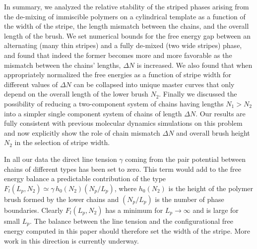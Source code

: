 In summary, we analyzed the relative stability of the striped phases  arising from the de-mixing of immiscible polymers 
on a cylindrical template as a function of the width of the stripe, the length mismatch between the chains, and the overall length of the brush. We set numerical bounds for the free energy gap between an alternating (many thin stripes) and a fully de-mixed (two wide stripes) phase, and found that indeed the former
becomes more and more favorable as the mismatch between the chains' lengths, $\Delta N$ is increased.
We also found that when appropriately normalized the free energies as a function of stripe width for different values of $\Delta N$  can be collapsed into unique master curves that only depend on the overall length of the lower brush $N_2$. Finally we discussed the possibility of reducing a two-component system of chains 
having lengths $N_1>N_2$ into a simpler single component system of chains of length $\Delta N$.
Our results are fully consistent with previous molecular dynamics simulations on this problem and now 
explicitly show the role of chain mismatch $\Delta N$ and overall brush height $N_2$ in the selection of stripe width.

In all our  data the direct line tension $\gamma$ coming from the pair potential between chains of different types 
has been set to zero. This term would add to the free energy balance a predictable contribution of the type
$F_l(L_p,N_2)\simeq\gamma \, h_0(N_2) (N_p/L_p)$, where $h_0(N_2)$ is the height of the polymer brush formed by the lower chains and $(N_p/L_p)$ is the number of phase boundaries. Clearly $F_l(L_p,N_2)$ has a minimum for 
$L_p\rightarrow\infty$ and is large for small $L_p$. The balance between the line tension and the configurational free energy computed in this paper should therefore set the width of the stripe. More work in this direction is currently
underway.
